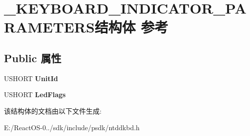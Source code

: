 \hypertarget{struct___k_e_y_b_o_a_r_d___i_n_d_i_c_a_t_o_r___p_a_r_a_m_e_t_e_r_s}{}\section{\+\_\+\+K\+E\+Y\+B\+O\+A\+R\+D\+\_\+\+I\+N\+D\+I\+C\+A\+T\+O\+R\+\_\+\+P\+A\+R\+A\+M\+E\+T\+E\+R\+S结构体 参考}
\label{struct___k_e_y_b_o_a_r_d___i_n_d_i_c_a_t_o_r___p_a_r_a_m_e_t_e_r_s}
\subsection*{Public 属性}
\begin{DoxyCompactItemize}
\item 
\mbox{\label{struct___k_e_y_b_o_a_r_d___i_n_d_i_c_a_t_o_r___p_a_r_a_m_e_t_e_r_s_a8b0a6d01d9c4528a4f109332fb15eb74}} 
U\+S\+H\+O\+RT {\bfseries Unit\+Id}
\item 
\mbox{\label{struct___k_e_y_b_o_a_r_d___i_n_d_i_c_a_t_o_r___p_a_r_a_m_e_t_e_r_s_a9779f04e32ec2466f8965e78da8db539}} 
U\+S\+H\+O\+RT {\bfseries Led\+Flags}
\end{DoxyCompactItemize}


该结构体的文档由以下文件生成\+:\begin{DoxyCompactItemize}
\item 
E\+:/\+React\+O\+S-\/0../sdk/include/psdk/ntddkbd.\+h\end{DoxyCompactItemize}
